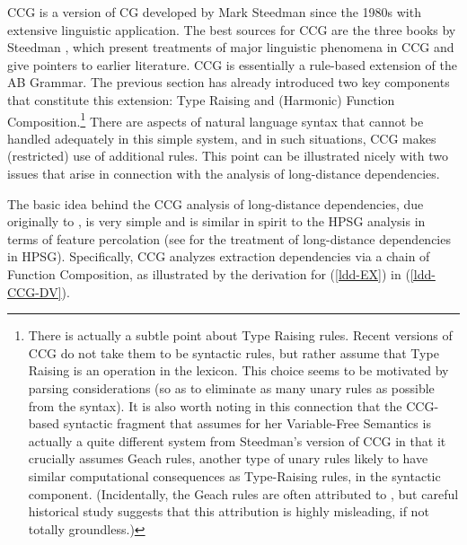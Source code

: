 \documentclass[output=paper
                ,modfonts
 	        ,biblatex
                ,babelshorthands
                ,newtxmath
                ,draftmode
                ,colorlinks, citecolor=brown
]{langscibook}
\begin{document}
CCG is a version of CG developed by Mark Steedman since the 1980s with
extensive linguistic application. The best sources for CCG are the
three books by Steedman \citep{Steedman97a,Steedman2000a-u,steedman2012},
which present treatments of major linguistic phenomena in CCG and
give pointers to earlier literature. CCG is essentially a rule-based
extension of the AB Grammar. The previous
section has already introduced two key components that constitute this extension: Type
Raising and (Harmonic) Function Composition.\footnote{There is
actually a subtle point about Type Raising rules. Recent
versions of CCG \citep[80]{steedman2012} do not take them to be syntactic rules,
but rather assume that Type Raising is an operation in the lexicon.
This choice seems to be motivated by 
parsing considerations (so as to eliminate as  many unary rules as
possible from the syntax). It is also worth noting in this
connection that the CCG-based syntactic fragment that
\citet{Jacobson1999a,Jacobson2000a} assumes for her Variable-Free Semantics
is actually a quite different system from Steedman's version of CCG in
that it crucially assumes Geach rules, another type of unary rules
likely to have similar computational consequences as Type-Raising rules, in the syntactic
component. (Incidentally,  the Geach rules are often attributed
to \citet{Geach70a},  but  careful
historical study suggests that this attribution is highly misleading, if not
totally groundless.)} There are 
aspects of natural language syntax that cannot 
be handled adequately in this simple system, and in such situations,
CCG makes (restricted) use of additional rules. This point can be
illustrated nicely with two issues that arise in connection with the
analysis of long-distance dependencies.

The basic idea behind the CCG analysis of long-distance dependencies,
due originally to \citet{AS82a}, is very simple and is similar in spirit to
the HPSG analysis in terms of \slasch feature percolation (see
for the treatment of long-distance dependencies in HPSG). Specifically,
CCG analyzes extraction dependencies via a chain of Function
Composition, as illustrated by the derivation for (\ref{ldd-EX}) in (\ref{ldd-CCG-DV}).
\end{document}

